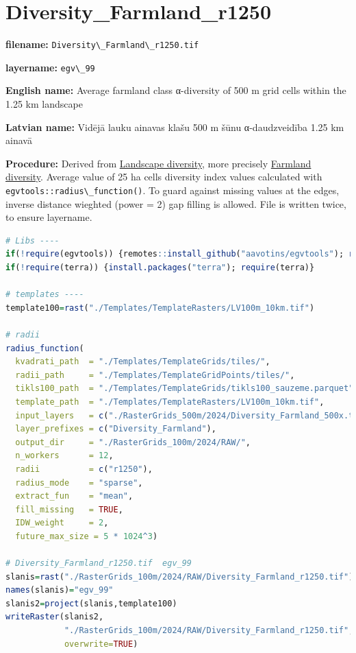 \documentclass[
]{book}
\newcommand{\passthrough}[1]{#1}
\begin{document}
\section{Diversity\_Farmland\_r1250}\label{ch06.099}

\textbf{filename:} \passthrough{\lstinline!Diversity\_Farmland\_r1250.tif!}

\textbf{layername:} \passthrough{\lstinline!egv\_99!}

\textbf{English name:} Average farmland class α-diversity of 500 m grid cells within the 1.25 km landscape

\textbf{Latvian name:} Vidējā lauku ainavas klašu 500 m šūnu α-daudzveidība 1.25 km ainavā

\textbf{Procedure:} Derived from \hyperref[Ch05.04]{Landscape diversity}, more precisely
\hyperref[Ch05.04.0]{Farmland diversity}. Average value of 25 ha
cells diversity index values calculated with \passthrough{\lstinline!egvtools::radius\_function()!}. To
guard against missing values at the edges, inverse distance wieghted (power = 2)
gap filling is allowed. File is written twice, to ensure layername.

\begin{lstlisting}[language=R]
# Libs ----
if(!require(egvtools)) {remotes::install_github("aavotins/egvtools"); require(egvtools)}
if(!require(terra)) {install.packages("terra"); require(terra)}

# templates ----
template100=rast("./Templates/TemplateRasters/LV100m_10km.tif")

# radii
radius_function(
  kvadrati_path  = "./Templates/TemplateGrids/tiles/",
  radii_path     = "./Templates/TemplateGridPoints/tiles/",
  tikls100_path  = "./Templates/TemplateGrids/tikls100_sauzeme.parquet",
  template_path  = "./Templates/TemplateRasters/LV100m_10km.tif",
  input_layers   = c("./RasterGrids_500m/2024/Diversity_Farmland_500x.tif"),
  layer_prefixes = c("Diversity_Farmland"),
  output_dir     = "./RasterGrids_100m/2024/RAW/",
  n_workers      = 12,
  radii          = c("r1250"),
  radius_mode    = "sparse",
  extract_fun    = "mean",
  fill_missing   = TRUE,
  IDW_weight     = 2,
  future_max_size = 5 * 1024^3)

# Diversity_Farmland_r1250.tif  egv_99
slanis=rast("./RasterGrids_100m/2024/RAW/Diversity_Farmland_r1250.tif")
names(slanis)="egv_99"
slanis2=project(slanis,template100)
writeRaster(slanis2,
            "./RasterGrids_100m/2024/RAW/Diversity_Farmland_r1250.tif",
            overwrite=TRUE)
\end{lstlisting}
\end{document}
